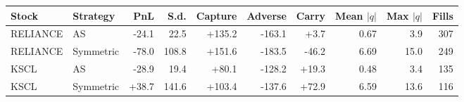 \begin{tabular}{llrrrrrrrr}
\toprule
Stock & Strategy & PnL & S.d. & Capture & Adverse & Carry & Mean $|q|$ & Max $|q|$ & Fills \\
\midrule
RELIANCE & AS & -24.1 & 22.5 & +135.2 & -163.1 & +3.7 & 0.67 & 3.9 & 307 \\
RELIANCE & Symmetric & -78.0 & 108.8 & +151.6 & -183.5 & -46.2 & 6.69 & 15.0 & 249 \\
KSCL & AS & -28.9 & 19.4 & +80.1 & -128.2 & +19.3 & 0.48 & 3.4 & 135 \\
KSCL & Symmetric & +38.7 & 141.6 & +103.4 & -137.6 & +72.9 & 6.59 & 13.6 & 116 \\
\bottomrule
\end{tabular}
